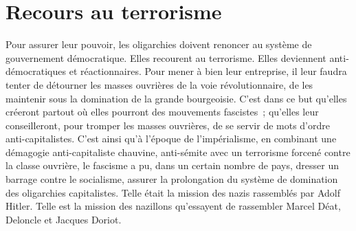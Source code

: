 \documentclass[french,twoside]{book} %
\begin{document}
\section[{Recours au terrorisme}]{Recours au terrorisme}
\noindent Pour assurer leur pouvoir, les oligarchies doivent renoncer au système de gouvernement démocratique. Elles recourent au terrorisme. Elles deviennent anti-démocratiques et réactionnaires. Pour mener à bien leur entreprise, il leur faudra tenter de détourner les masses ouvrières de la voie révolutionnaire, de les maintenir sous la domination de la grande bourgeoisie. C’est dans ce but qu’elles créeront partout où elles pourront des mouvements fascistes ; qu’elles leur conseilleront, pour tromper les masses ouvrières, de se servir de mots d’ordre anti-capitalistes. C’est ainsi qu’à l’époque de l’impérialisme, en combinant une démagogie anti-capitaliste chauvine, anti-sémite avec un terrorisme forcené contre la classe ouvrière, le fascisme a pu, dans un certain nombre de pays, dresser un barrage contre le socialisme, assurer la prolongation du système de domination des oligarchies capitalistes. Telle était la mission des nazis rassemblés par Adolf Hitler. Telle est la mission des nazillons qu’essayent de rassembler Marcel Déat, Deloncle et Jacques Doriot.
\end{document}
